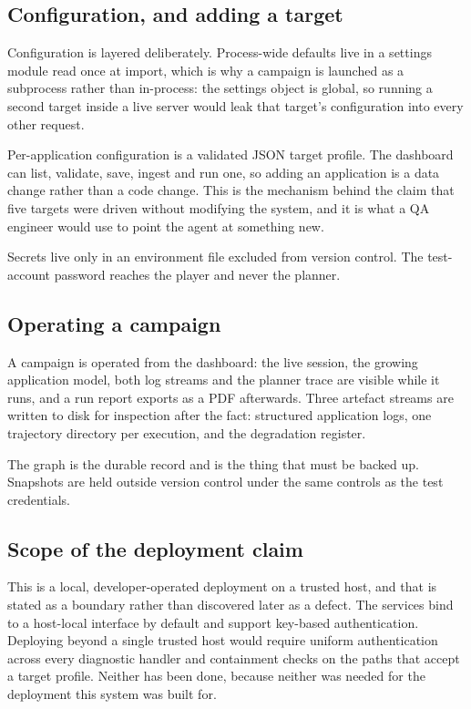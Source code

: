 \subsection{Configuration, and adding a target}

Configuration is layered deliberately. Process-wide defaults live in a settings
module read once at import, which is why a campaign is launched as a subprocess
rather than in-process: the settings object is global, so running a second
target inside a live server would leak that target's configuration into every
other request.

Per-application configuration is a validated JSON target profile. The dashboard
can list, validate, save, ingest and run one, so adding an application is a
data change rather than a code change. This is the mechanism behind the claim
that five targets were driven without modifying the system, and it is what a
QA engineer would use to point the agent at something new.

Secrets live only in an environment file excluded from version control. The
test-account password reaches the player and never the planner.

\subsection{Operating a campaign}

A campaign is operated from the dashboard: the live session, the growing
application model, both log streams and the planner trace are visible while it
runs, and a run report exports as a PDF afterwards. Three artefact streams are
written to disk for inspection after the fact: structured application logs, one
trajectory directory per execution, and the degradation register.

The graph is the durable record and is the thing that must be backed up.
Snapshots are held outside version control under the same controls as the test
credentials.

\subsection{Scope of the deployment claim}

This is a local, developer-operated deployment on a trusted host, and that is
stated as a boundary rather than discovered later as a defect. The services
bind to a host-local interface by default and support key-based authentication.
Deploying beyond a single trusted host would require uniform authentication
across every diagnostic handler and containment checks on the paths that accept
a target profile. Neither has been done, because neither was needed for the
deployment this system was built for.
